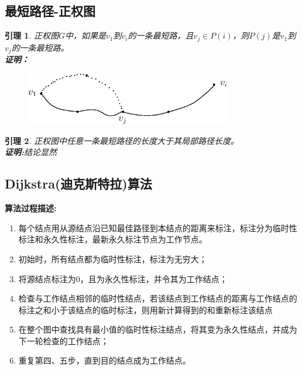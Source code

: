 \documentclass[11pt,a4paper,openany]{book}
\newtheorem{lemma}{\textbf{引理}}[section]
\begin{document}
\subsection{最短路径-正权图}
\begin{lemma}\K
正权图$G$中，如果是$v_1$到$v_i$的一条最短路，且$v_j\in P(i)$，则$P(j)$是$v_1$到$v_j$的一条最短路。\\
\textbf{证明：}
\begin{figure}[H]
  \centering
  \includegraphics[width=0.8\textwidth]{2_6_1.eps}\\
  \caption*{}
\end{figure}
\end{lemma}
\begin{lemma}\K
正权图中任意一条最短路径的长度大于其局部路径长度。\\
\textbf{证明:}结论显然
\end{lemma}
\subsection{Dijkstra(迪克斯特拉)算法}
\textbf{算法过程描述:}\\
\begin{enumerate}
  \item 每个结点用从源结点沿已知最佳路径到本结点的距离来\textcolor[rgb]{1.00,0.00,0.00}{标注}，标注分为\textcolor[rgb]{1.00,0.00,0.00}{临时性标注}和\textcolor[rgb]{1.00,0.00,0.00}{永久性标注}，最新永久标注节点为\textcolor[rgb]{1.00,0.00,0.00}{工作节点}。
  \item 初始时，所有结点都为临时性标注，标注为无穷大；
  \item 将源结点标注为$0$，且为永久性标注，并令其为工作结点；
  \item 检查与工作结点相邻的临时性结点，若该结点到工作结点的距离与工作结点的标注之和小于该结点的临时标注，则用新计算得到的和重新标注该结点
  \item 在整个图中查找具有最小值的临时性标注结点，将其变为永久性结点，并成为下一轮检查的工作结点；
  \item 重复第四、五步，直到目的结点成为工作结点。
\end{enumerate}
\end{document}
